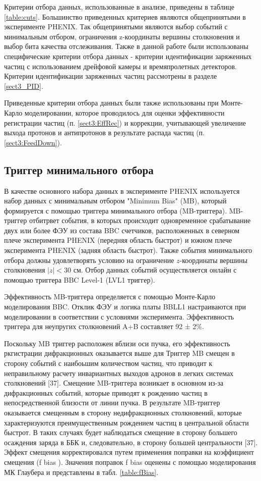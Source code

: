 Критерии отбора данных, использованные в анализе, приведены в таблице \ref{table:cuts}. Большинство приведенных критериев являются общепринятыми в эксперименте PHENIX. Так общепринятыми являются  выбор событий с минимальным отбором, ограничения z-координаты вершины столкновения и выбор бита качества отслеживания. Также в данной работе были использованы специфические критерии отбора данных -  критерии идентификации заряженных частиц с использованием дрейфовой камеры и времяпролетных детекторов. Критерии идентификации заряженных частиц рассмотрены в разделе \ref{sect3_PID}.

Приведенные критерии отбора данных были также использованы при Монте-Карло моделировании, которое проводилось для оценки эффективности регистрации частиц (п. \ref{sect3:EffRec}) и коррекции, учитывающей увеличение выхода протонов и антипротонов в результате распада частиц (п. \ref{sect3:FeedDown}). 

\subsection{Триггер минимального отбора}
В качестве основного набора данных в эксперименте PHENIX используется набор данных с минимальным отбором "Minimum Bias" (MB), который формируется с помощью триггера минимального отбора (MB-триггера).
MB-триггер отбитрвет события, в которых происходит одновременное срабатывание двух или более ФЭУ из состава BBC счетчиков, расположенных в северном плече эксперимента PHENIX (передняя область быстрот) и южном плече эксперимента PHENIX (задняя область быстрот).
Также события минимального отбора должны удовлетворять условию на ограничение $z$-координаты вершины столкновения $|z| < $30 см. Отбор данных событий осуществляется онлайн с помощью триггера BBC Level-1 (LVL1 триггер).

Эффективность MB-триггера определяется с помощью Монте-Карло моделирования BBC. Отклик ФЭУ и логика платы BBLL1 настраиваются при моделировании в соответствии с условиями эксперимента. Эффективность триггера для неупругих столкновений A+B составляет 92 ± 2\%. 

Поскольку MB триггер расположен вблизи оси пучка, его эффективность ркгистрации дифракционных оказывается выше для 
Триггер MB смещен в сторону событий с наибоьшим количеством частиц, что приводит к неправильному расчету инвариантных выходов адронов в легких системах столкновений [37]. Смещение MB-триггера возникает в основном из-за дифракционных событий, которые приводят к рождению частиц в непосредственной близости от линии пучка. В результате MB-триггер оказывается смещенным в сторону недифракционных столкновений, которые характеризуются преимущественным рождением частиц в центральной области быстрот. В таких случаях будет наблюдаться смещение в сторону большего осаждения заряда в ББК и, следовательно, в сторону большей центральности [37]. Эффект смещения корректировался путем применения поправки на коэффициент смещения (f bias ). Значения поправок f bias оценены с помощью моделирования МК Глаубера и представлены в табл. \ref{table:fBias}.


